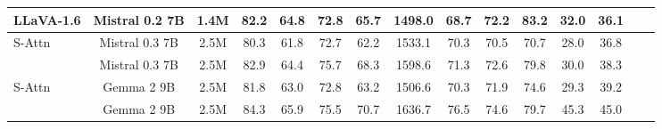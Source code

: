 \begin{table}[t]
{\begin{tabular}{@{\extracolsep{4pt}}lcc|cccccccccccc@{}}
LLaVA-1.6 & Mistral 0.2 7B & 1.4M & 82.2 & 64.8 & 72.8 & 65.7 & 1498.0 & 68.7 & 72.2 & 83.2 & 32.0 & 36.1 \\
\midrule
S-Attn & Mistral 0.3 7B & 2.5M & 80.3 & 61.8 & 72.7 & 62.2 & 1533.1 & 
70.3 & 70.5 & 70.7 & 28.0 & 36.8 \\
\method{} & Mistral 0.3 7B & 2.5M & 82.9 & 64.4 & 75.7 & 68.3 & 1598.6 & 71.3 & 72.6 & 79.8 & 30.0 & 38.3 \\
S-Attn & Gemma 2 9B & 2.5M & 81.8 & 63.0 & 72.8 & 63.2 & 1506.6 & 70.3 & 71.9 & 74.6 & 29.3 & 39.2 \\
\method{} & Gemma 2 9B & 2.5M & 84.3 & 65.9 & 75.5 & 70.7 & 1636.7 & 76.5 & 74.6 & 79.7 & 45.3 & 45.0 \\
\bottomrule
\end{tabular}
}
\end{table}